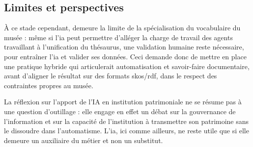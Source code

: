 \subsection{Limites et perspectives}

À ce stade cependant, demeure la limite de la spécialisation du vocabulaire du musée : même si l'\ac{ia} peut permettre d'alléger la charge de travail des agents travaillant à l'unification du thésaurus, une validation humaine reste nécessaire, pour entraîner l'\ac{ia} et valider ses données. Ceci demande donc de mettre en place une pratique hybride qui articulerait automatisation et savoir-faire documentaire, avant d'aligner le résultat sur des formats \ac{skos}/\ac{rdf}, dans le respect des contraintes propres au musée.

La réflexion sur l’apport de l’IA en institution patrimoniale ne se résume pas à une question d’outillage : elle engage en effet un débat sur la gouvernance de l’information et sur la capacité de l’institution à transmettre son patrimoine sans le dissoudre dans l’automatisme. L'\ac{ia}, ici comme ailleurs, ne reste utile que si elle demeure un auxiliaire du métier et non un substitut. 